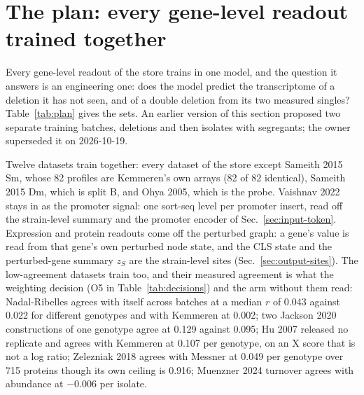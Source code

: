 
\section{The plan: every gene-level readout trained together}
\label{sec:proposal}

Every gene-level readout of the store trains in one model, and the question it answers
is an engineering one: does the model predict the transcriptome of a deletion it has not
seen, and of a double deletion from its two measured singles? Table~\ref{tab:plan} gives
the sets. An earlier version of this section proposed two separate training batches,
deletions and then isolates with segregants; the owner superseded it on 2026-10-19.

\begin{table}[htbp]
\centering
\footnotesize
\caption[]{\textbf{The sets of the plan.} Records count the raw store (full pass of
, slurm job 5902); a split's count is strains held out, 10\% of
Kemmeren's 1{,}482 genes and a fifth of Muenzner's 795 isolates. Splits A and C are drawn
from training records; split B is a dataset of its own and never trains.}
\label{tab:plan}

\end{table}

Twelve datasets train together: every dataset of the store except Sameith 2015 Sm,
whose 82 profiles are Kemmeren's own arrays (82 of 82 identical), Sameith 2015 Dm, which
is split B, and Ohya 2005, which is the probe. Vaishnav 2022 stays in as the promoter
signal: one sort-seq level per promoter insert, read off the strain-level summary and
the promoter encoder of Sec.~\ref{sec:input-token}. Expression and protein readouts come
off the perturbed graph: a gene's value is read from that gene's own perturbed node state,
and the CLS state and the perturbed-gene summary $z_S$ are the strain-level sites
(Sec.~\ref{sec:output-sites}). The low-agreement datasets train too, and their measured
agreement is what the weighting decision (O5 in Table~\ref{tab:decisions}) and the arm
without them read: Nadal-Ribelles agrees with itself across batches at a median $r$ of
0.043 against 0.022 for different genotypes and with Kemmeren at 0.002; two Jackson 2020
constructions of one genotype agree at 0.129 against 0.095; Hu 2007 released no
replicate and agrees with Kemmeren at 0.107 per genotype, on an X score that is not a log
ratio; Zelezniak 2018 agrees with Messner at 0.049 per genotype over 715 proteins though
its own ceiling is 0.916; Muenzner 2024 turnover agrees with abundance at $-$0.006 per
isolate.

